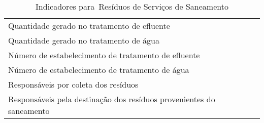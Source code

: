 \begin{table}[h!]
  \centering
  \caption{Indicadores para Resíduos de Serviços de Saneamento}
    \begin{tabular}{|p{25em}|}
    \rowcolor[rgb]{ .984,  .831,  .706} \multicolumn{1}{P{25em}}{RESÍDUOS DE SERVIÇOS DE SANEAMENTO} \\
    \midrule
    Quantidade gerado no tratamento de efluente \\
    \midrule
    Quantidade gerado no tratamento de água \\
    \midrule
    Número de estabelecimento de tratamento de efluente \\
    \midrule
    Número de estabelecimento de tratamento de água \\
    \midrule
    Responsáveis por coleta dos resíduos \\
    \midrule
    Responsáveis pela destinação dos resíduos provenientes do saneamento  \\
    \bottomrule
    \end{tabular}%
  \label{tab:ind_saneamento}%
\end{table}%
